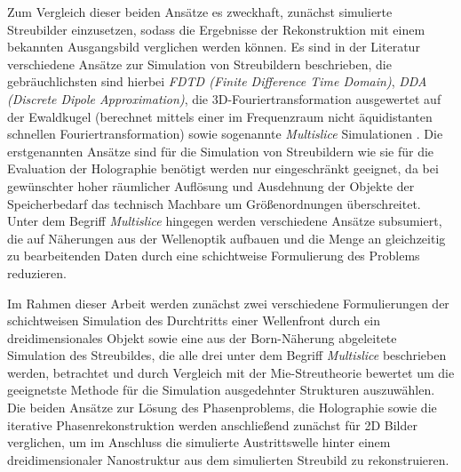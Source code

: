 Zum Vergleich dieser beiden Ansätze es zweckhaft, zunächst simulierte Streubilder einzusetzen, sodass die Ergebnisse der Rekonstruktion mit einem bekannten Ausgangsbild verglichen werden können. Es sind in der Literatur verschiedene Ansätze zur Simulation von Streubildern beschrieben, die gebräuchlichsten sind hierbei \textit{FDTD (Finite Difference Time Domain)}, \textit{DDA (Discrete Dipole Approximation)}, die 3D-Fouriertransformation ausgewertet auf der Ewaldkugel (berechnet mittels einer im Frequenzraum nicht äquidistanten schnellen Fouriertransformation) sowie sogenannte \textit{Multislice} Simulationen \cite{drezek1999,sander2014,hantke2016,hare1994,barke2015}. Die erstgenannten Ansätze sind für die Simulation von Streubildern wie sie für die Evaluation der Holographie benötigt werden nur eingeschränkt geeignet, da bei gewünschter hoher räumlicher Auflösung und Ausdehnung der Objekte der Speicherbedarf das technisch Machbare um Größenordnungen überschreitet. Unter dem Begriff \textit{Multislice} hingegen werden verschiedene Ansätze subsumiert, die auf Näherungen aus der Wellenoptik aufbauen und die Menge an gleichzeitig zu bearbeitenden Daten durch eine schichtweise Formulierung des Problems reduzieren. 

Im Rahmen dieser Arbeit werden zunächst zwei verschiedene Formulierungen der schichtweisen Simulation des Durchtritts einer Wellenfront durch ein dreidimensionales Objekt sowie eine aus der Born-Näherung abgeleitete Simulation des Streubildes, die alle drei unter dem Begriff \textit{Multislice} beschrieben werden, betrachtet und durch Vergleich mit der Mie-Streutheorie bewertet um die geeignetste Methode für die Simulation ausgedehnter Strukturen auszuwählen. Die beiden Ansätze zur Lösung des Phasenproblems, die Holographie sowie die iterative Phasenrekonstruktion werden anschließend zunächst für 2D Bilder verglichen, um im Anschluss die simulierte Austrittswelle hinter einem dreidimensionaler Nanostruktur aus dem simulierten Streubild zu rekonstruieren.

